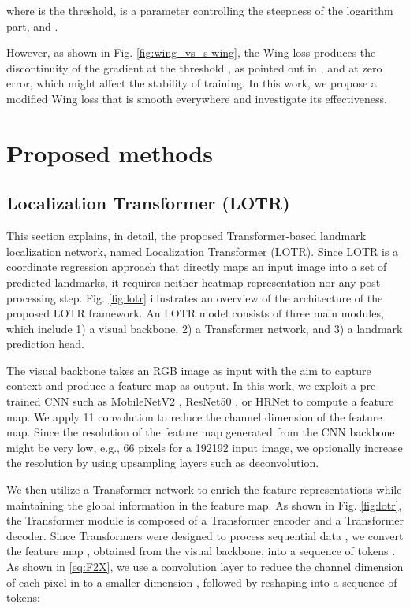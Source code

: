 \documentclass[journal]{IEEEtran}
\begin{document}
where  is the threshold,  is a parameter controlling the steepness of the logarithm part, and . 

However, as shown in Fig. \ref{fig:wing_vs_s-wing}, the Wing loss produces the discontinuity of the gradient at the threshold , as pointed out in \cite{Wang2019c}, and at zero error, which might affect the stability of training. 
In this work, we propose a modified Wing loss that is smooth everywhere and investigate its effectiveness.



\section{Proposed methods}\label{sec:proposed}

\subsection{Localization Transformer (LOTR)}\label{subsec:lotr}

This section explains, in detail, the proposed Transformer-based landmark localization network, named Localization Transformer (LOTR). 
Since LOTR is a coordinate regression approach that directly maps an input image into a set of predicted landmarks, it requires neither heatmap representation nor any post-processing step.  
Fig. \ref{fig:lotr} illustrates an overview of the architecture of the proposed LOTR framework.
An LOTR model consists of three main modules, which include 1) a visual backbone, 2) a Transformer network, and 3) a landmark prediction head.

The visual backbone takes an RGB image as input with the aim to capture context and produce a feature map as output.
In this work, we exploit a pre-trained CNN such as MobileNetV2 \cite{sandler2018}, ResNet50 \cite{resnet2016}, or HRNet \cite{Wang2021HRNet} to compute a feature map. 
We apply 11 convolution to reduce the channel dimension of the feature map.
Since the resolution of the feature map generated from the CNN backbone might be very low, e.g., 66 pixels for a 192192 input image, we optionally increase the resolution by using upsampling layers such as deconvolution.

We then utilize a Transformer network \cite{Vaswani} to enrich the feature representations while maintaining the global information in the feature map. 
As shown in Fig. \ref{fig:lotr}, the Transformer module is composed of a Transformer encoder and a Transformer decoder. 
Since Transformers were designed to process sequential data \cite{Vaswani}, we convert the feature map , obtained from the visual backbone, into a sequence of tokens .
As shown in \eqref{eq:F2X}, we use a  convolution layer to reduce the channel dimension  of each pixel in  to a smaller dimension , followed by reshaping into a sequence of tokens:
\end{document}

